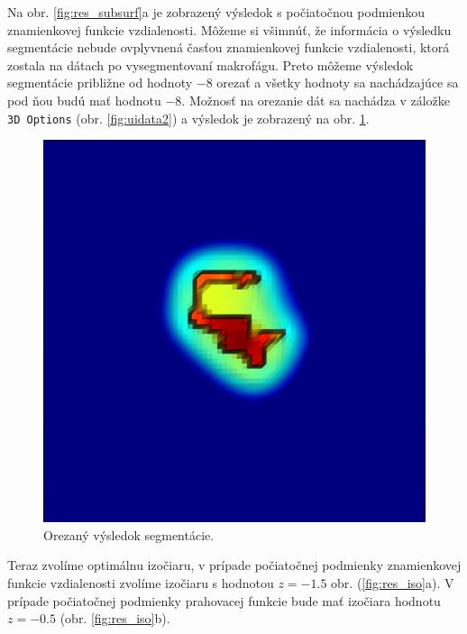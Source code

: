 \documentclass[a4paper,11pt,oneside]{article}%
\begin{document}
Na obr. \ref{fig:res_subsurf}a je zobrazený výsledok s počiatočnou podmienkou znamienkovej funkcie vzdialenosti. Môžeme si všimnúť, že informácia o výsledku segmentácie nebude ovplyvnená časťou znamienkovej funkcie vzdialenosti, ktorá zostala na dátach po vysegmentovaní makrofágu. Preto môžeme výsledok segmentácie približne od hodnoty $-8$ orezať a všetky hodnoty sa nachádzajúce sa pod ňou budú mať hodnotu $-8$.  Možnosť na orezanie dát sa nachádza v záložke \texttt{3D Options} (obr. \ref{fig:uidata2}) a výsledok je zobrazený na obr. \ref{fig:res_cut}. 
 
\begin{figure}[H]
 \begin{center} 
 \includegraphics[scale=0.30]{pics/pr_subsurf_cut.png}
\caption{Orezaný výsledok segmentácie.}
\label{fig:res_cut}
\end{center} 
\end{figure}

Teraz zvolíme optimálnu izočiaru, v prípade počiatočnej podmienky znamienkovej funkcie vzdialenosti zvolíme izočiaru s hodnotou $z = -1.5$ obr. (\ref{fig:res_iso}a). V prípade počiatočnej podmienky prahovacej funkcie bude mať izočiara hodnotu $z = -0.5$ (obr. \ref{fig:res_iso}b). 
\end{document}
